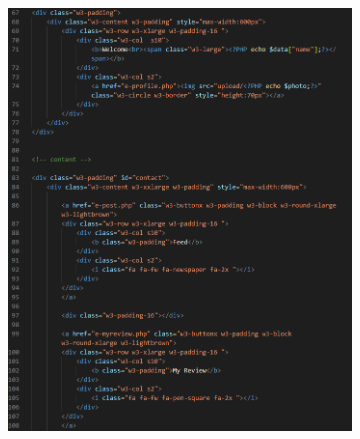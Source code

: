 \begin{enumerate}[1.]
\begin{figure}[h]
\begin{subfigure}[b]{0.6\textwidth}
            \includegraphics[width=\textwidth]{mainmatter/images/frontend/code/emain.png}
            \label{fig:sub1}
        \end{subfigure}
        \hspace{0.04\textwidth}
        \begin{subfigure}[b]{0.6\textwidth}
            \centering

\end{subfigure}
\end{figure}
\end{enumerate}
